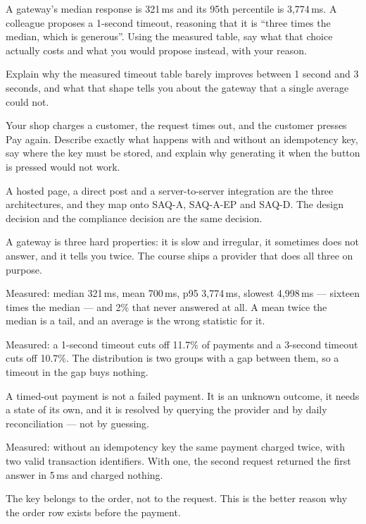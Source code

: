 \begin{checkpoint}
\begin{tightnum}
  \item A gateway's median response is 321\,ms and its 95th percentile is
        3{,}774\,ms. A colleague proposes a 1-second timeout, reasoning that it
        is ``three times the median, which is generous''. Using the measured
        table, say what that choice actually costs and what you would propose
        instead, with your reason.
  \item Explain why the measured timeout table barely improves between 1 second
        and 3 seconds, and what that shape tells you about the gateway that a
        single average could not.
  \item Your shop charges a customer, the request times out, and the customer
        presses Pay again. Describe exactly what happens with and without an
        idempotency key, say where the key must be stored, and explain why
        generating it when the button is pressed would not work.
\end{tightnum}
\end{checkpoint}

\begin{chaptersummary}
\begin{tight}
  \item A hosted page, a direct post and a server-to-server integration are the
        three architectures, and they map onto SAQ-A, SAQ-A-EP and SAQ-D. The
        design decision and the compliance decision are the same decision.
  \item A gateway is three hard properties: it is slow and irregular, it
        sometimes does not answer, and it tells you twice. The course ships a
        provider that does all three on purpose.
  \item Measured: median 321\,ms, mean 700\,ms, p95 3{,}774\,ms, slowest
        4{,}998\,ms --- sixteen times the median --- and 2\% that never
        answered at all. A mean twice the median is a tail, and an average is
        the wrong statistic for it.
  \item Measured: a 1-second timeout cuts off 11.7\% of payments and a
        3-second timeout cuts off 10.7\%. The distribution is two groups with a
        gap between them, so a timeout in the gap buys nothing.
  \item A timed-out payment is not a failed payment. It is an unknown outcome,
        it needs a state of its own, and it is resolved by querying the
        provider and by daily reconciliation --- not by guessing.
  \item Measured: without an idempotency key the same payment charged twice,
        with two valid transaction identifiers. With one, the second request
        returned the first answer in 5\,ms and charged nothing.
  \item The key belongs to the order, not to the request. This is the better
        reason why the order row exists before the payment.
\end{tight}
\end{chaptersummary}

